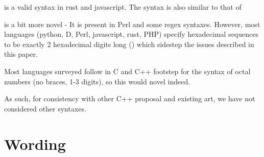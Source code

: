 \documentclass{wg21}
\begin{document}
 is a valid syntax in rust and javascript.
The syntax is also similar to that of 

 is a bit more novel - It is present in Perl and some regex syntaxes.
However, most languages (python, D, Perl, javascript, rust, PHP) specify hexadecimal sequences to be exactly 2 hexadecimal digits long () which sidestep the issues described in this paper.

Most languages surveyed follow in C and C++ footstep for the syntax of octal numbers (no braces, 1-3 digits), so this would novel indeed.

As such, for consistency with other C++ proposal and existing art, we have not considered other syntaxes.

\section{Wording}
\end{document}
